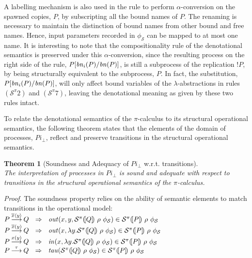 \documentclass[10pt,a4paper,final,oneside,fleqn]{book}
\newcommand*{\todefoutpi}{\mathbin{\mathop{\longrightarrow}\limits^{\overline{x}\langle y\rangle}}}
\newcommand*{\todefoutbpi}{\mathbin{\mathop{\longrightarrow}\limits^{\overline{x}{(}y{)}}}}
\newcommand*{\todefinpi}{\mathbin{\mathop{\longrightarrow}\limits^{x(y)}}}
\newcommand*{\todeftaupi}{\mathbin{\mathop{\longrightarrow}\limits^{\tau}}}
\begin{document}
A labelling mechanism is also used in the rule to perform $\alpha$-conversion on the spawned copies, $P$, by subscripting all the bound names of $P$.  The renaming is necessary to maintain the distinction of bound names from other bound and free names.  Hence, input parameters recorded in $\phi_\mathcal{S}$ can be mapped to at most one name.  It is interesting to note that the compositionality rule of the denotational semantics is preserved under this $\alpha$-conversion, since the resulting process on the right side of the rule, $P[\mbox{{\itshape bn\/}}_i(P)/\mbox{{\itshape bn\/}}(P)]$, is still a subprocess of the replication $!P$, by being structurally equivalent to the subprocess, $P$.  In fact, the substitution, $P[\mbox{{\itshape bn\/}}_i(P)/\mbox{{\itshape bn\/}}(P)]$, will only affect bound variables of the $\lambda$-abstractions in rules $(\mathcal{S}^\pi 2)$ and $(\mathcal{S}^\pi 7)$, leaving the denotational meaning as given by these two rules intact.

To relate the denotational semantics of the $\pi$-calculus to its structural operational semantics, the following theorem states that the elements of the domain of processes, $Pi_\bot$, reflect and preserve transitions in the structural operational semantics.

\newtheorem{theor}{Theorem}
\begin{theor}[Soundness and Adequacy of $Pi_\bot$ w.r.t. transitions\label{soundnessPi}] $ $\\
The interpretation of processes in $Pi_\bot$ is sound and adequate with respect to transitions in the structural operational semantics of the $\pi$-calculus.
\end{theor}
{\itshape Proof\/}.  The soundness property relies on the ability of semantic elements to match transitions in the operational model:\\
$P\todefoutpi Q~~\Rightarrow~~\mbox{{\itshape out\/}}(x,y,\mathcal{S}^\pi(\![Q]\!)~\rho~\phi_\mathcal{S})\in\mathcal{S}^{\pi}(\![P]\!)~\rho~\phi_\mathcal{S}$\\
$P\todefoutbpi Q~~\Rightarrow~~\mbox{{\itshape out\/}}(x,\lambda y.\mathcal{S}^\pi(\![Q]\!)~\rho~\phi_\mathcal{S})\in\mathcal{S}^{\pi}(\![P]\!)~\rho~\phi_\mathcal{S}$\\
$P\todefinpi Q~~\Rightarrow~~\mbox{{\itshape in\/}}(x,\lambda y.\mathcal{S}^\pi(\![Q]\!)~\rho~\phi_\mathcal{S})\in\mathcal{S}^{\pi}(\![P]\!)~\rho~\phi_\mathcal{S}$\\
$P\todeftaupi Q~~\Rightarrow~~\mbox{{\itshape tau\/}}(\mathcal{S}^\pi(\![Q]\!)~\rho~\phi_\mathcal{S})\in\mathcal{S}^{\pi}(\![P]\!)~\rho~\phi_\mathcal{S}$\vspace{5mm}
\end{document}
